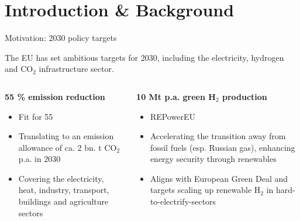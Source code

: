 \documentclass[10pt,aspectratio=169,dvipsnames]{beamer}
\begin{document}
\section{Introduction \& Background}
\begin{frame}{Motivation: 2030 policy targets}
  \footnotesize

  The EU has set ambitious targets for 2030, including the electricity, hydrogen and CO$_2$ infrastructure sector.

  \begin{columns}[T] %
    \begin{column}{.3\textwidth}
        \begin{minipage}[t][.45\textheight]{\linewidth}
            \begin{alertblock}{\textbf{55 \% emission reduction}}
                \begin{itemize}
                  \item \alert{Fit for 55}
                  \item Translating to an emission allowance of ca. 2 bn. t CO$_2$ p.a. in 2030
                  \item Covering the electricity, heat, industry, transport, buildings and agriculture sectors \newline
                \end{itemize}
                \vspace{0.06cm}
            \end{alertblock}
        \end{minipage}
    \end{column}
    
    \begin{column}{.34\textwidth}
        \begin{minipage}[t][.45\textheight]{\linewidth}
            \begin{exampleblock}{\textbf{10 Mt p.a. green H$_2$ production}}
                \begin{itemize}
                  \item \alert{REPowerEU}
                  \item Accelerating the transition away from fossil fuels (esp. Russian gas), enhancing energy security through renewables
                  \item Aligns with European Green Deal and targets scaling up renewable H$_2$ in hard-to-electrify-sectors
                \end{itemize}
            \end{exampleblock}
        \end{minipage}
    \end{column}


\end{columns}
\end{frame}
\end{document}
